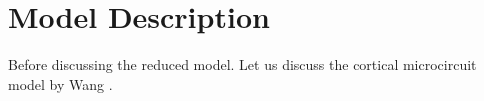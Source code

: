 \chapter*{Model Description}

Before discussing the reduced model. Let us discuss the  cortical microcircuit model by Wang \cite{wang2002probabilistic}. 

\newpage\cleardoublepage

\newpage\cleardoublepage